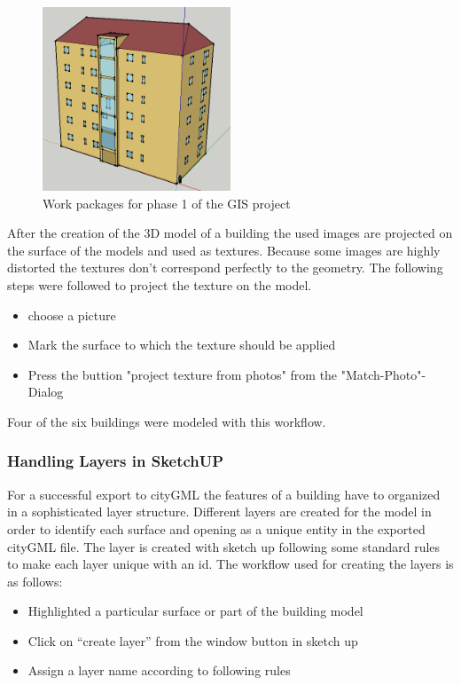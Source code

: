 \begin{figure}[ht]
	\centering
	\includegraphics[width=0.5\textwidth]{phase1/group2/figures/Building_wiclef.png}
	\caption{Work packages for phase 1 of the GIS project}
	\label{fig:Building_wiclef}
\end{figure}

After the creation of the 3D model of a building the used images are projected on the surface of the models and used as textures. Because some images are highly distorted the textures don't correspond perfectly to the geometry. The following steps were followed to project the texture on the model.

\begin{itemize}
\item choose a picture
\item Mark the surface to which the texture should be applied 
\item Press the buttion "project texture from photos" from the "Match-Photo"-Dialog
\end{itemize}

Four of the six buildings were modeled with this workflow.


\subsubsection{Handling Layers in SketchUP}

For a successful export to cityGML the features of a building have to organized in a sophisticated layer structure.
Different layers are created for the model in order to identify each surface and opening as a unique entity in the exported cityGML file. The layer is created with sketch up following some standard rules to make each layer unique with an id. The workflow used for creating the layers is as follows:


\begin{itemize}
\item Highlighted a particular surface or part of the building model 
\item Click on ``create layer'' from the window button in sketch up
\item Assign a layer name according to following rules
\end{itemize}

